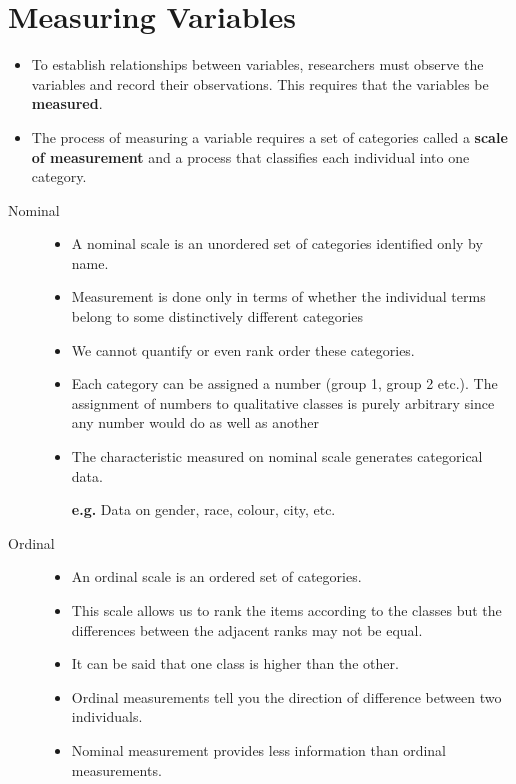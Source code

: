 \documentclass[
10pt, %
a4paper, %
]{report}
\begin{document}
\section{Measuring Variables}
\begin{itemize}
\item To establish relationships between variables, researchers must observe the variables and record their observations. This requires that the variables be \textbf{measured}.
\item The process of measuring a variable requires a set of categories called a \textbf{scale of measurement} and a process that classifies each individual into one category.
\end{itemize}

\begin{description}
\item[Nominal]
\begin{itemize}
\item[]
\item A nominal scale is an unordered set of categories identified only by name.
\item Measurement is done only in terms of whether the individual terms belong to some distinctively different categories
\item We cannot quantify or even rank order these categories.
\item Each category can be assigned a number (group 1, group 2 etc.). The assignment of numbers to qualitative classes is purely arbitrary since any number would do as well as another
\item The characteristic measured on nominal scale generates categorical data.
\item[\textbf{e.g.}] Data on gender, race, colour, city, etc.
\end{itemize}
\item[Ordinal]
\begin{itemize}
\item[]
\item An ordinal scale is an ordered set of categories.
\item This scale allows us to rank the items according to the classes but the differences between the adjacent ranks may not be equal.
\item It can be said that one class is higher than the other.
\item Ordinal measurements tell you the direction of difference between two individuals.
\item Nominal measurement provides less information than ordinal measurements.

\end{itemize}
\end{description}
\end{document}
